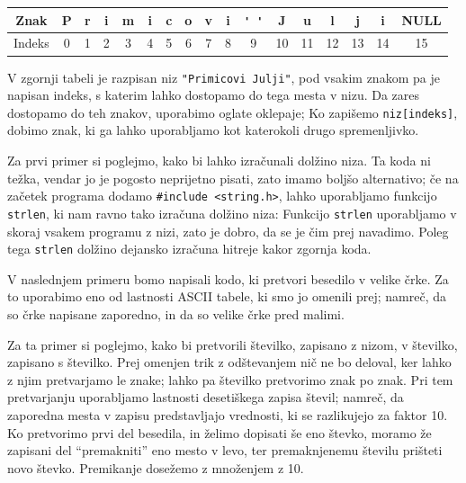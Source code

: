 \documentclass{book}
\begin{document}
\vspace{0.5cm}

\begin{tabular}[h!]{|c|cccccccccccccccc|}
  Znak & P & r & i & m & i & c & o & v & i & \verb+' '+  & J & u & l & j & i & NULL \\
  \hline
  Indeks & 0 & 1 & 2 & 3 & 4 & 5 & 6 & 7 & 8 & 9 & 10 & 11 & 12 & 13 & 14 & 15 \\
\end{tabular}

\vspace{0.5cm}

V zgornji tabeli je razpisan niz \verb+"Primicovi Julji"+, pod vsakim znakom pa
je napisan indeks, s katerim lahko dostopamo do tega mesta v nizu.
Da zares dostopamo do teh znakov, uporabimo oglate oklepaje;
Ko zapišemo \verb+niz[indeks]+, dobimo znak, ki ga lahko uporabljamo kot
katerokoli drugo spremenljivko.

\begin{examples}
  Za prvi primer si poglejmo, kako bi lahko izračunali dolžino niza.
  Ta koda ni težka, vendar jo je pogosto neprijetno pisati, zato imamo boljšo
  alternativo; če na začetek programa dodamo \verb+#include <string.h>+, lahko
  uporabljamo funkcijo \verb+strlen+, ki nam ravno tako izračuna dolžino niza:
  Funkcijo \verb+strlen+ uporabljamo v skoraj vsakem programu z nizi, zato je
  dobro, da se je čim prej navadimo.
  Poleg tega \verb+strlen+ dolžino dejansko izračuna hitreje kakor zgornja koda.
\end{examples}

\begin{examples}
  V naslednjem primeru bomo napisali kodo, ki pretvori besedilo v velike črke.
  Za to uporabimo eno od lastnosti ASCII tabele, ki smo jo omenili prej; namreč,
  da so črke napisane zaporedno, in da so velike črke pred malimi.
\end{examples}

\begin{examples}
  Za ta primer si poglejmo, kako bi pretvorili številko, zapisano z nizom, v
  številko, zapisano s številko.
  Prej omenjen trik z odštevanjem nič ne bo deloval, ker lahko z njim
  pretvarjamo le znake; lahko pa številko pretvorimo znak po znak.
  Pri tem pretvarjanju uporabljamo lastnosti desetiškega zapisa števil; namreč,
  da zaporedna mesta v zapisu predstavljajo vrednosti, ki se razlikujejo za
  faktor 10.
  Ko pretvorimo prvi del besedila, in želimo dopisati še eno števko, moramo že
  zapisani del ``premakniti'' eno mesto v levo, ter premaknjenemu številu
  prišteti novo števko.
  Premikanje dosežemo z množenjem z 10.
\end{examples}
\end{document}
